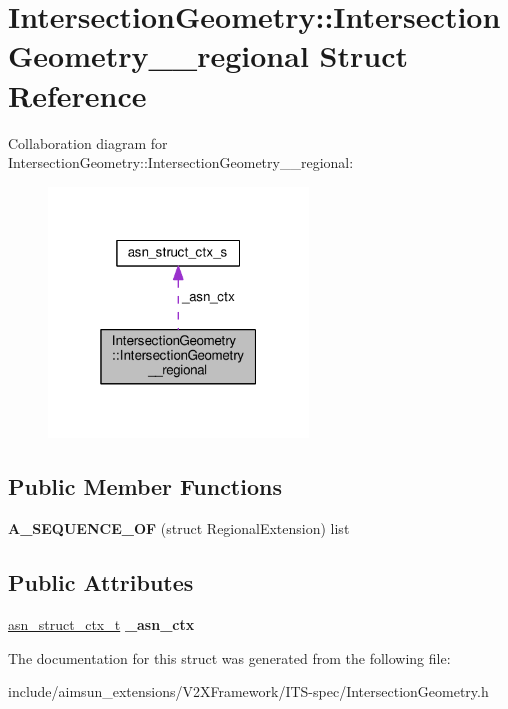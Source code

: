 \hypertarget{structIntersectionGeometry_1_1IntersectionGeometry____regional}{}\section{Intersection\+Geometry\+:\+:Intersection\+Geometry\+\_\+\+\_\+regional Struct Reference}
\label{structIntersectionGeometry_1_1IntersectionGeometry____regional}


Collaboration diagram for Intersection\+Geometry\+:\+:Intersection\+Geometry\+\_\+\+\_\+regional\+:\nopagebreak
\begin{figure}[H]
\begin{center}
\leavevmode
\includegraphics[width=196pt]{structIntersectionGeometry_1_1IntersectionGeometry____regional__coll__graph}
\end{center}
\end{figure}
\subsection*{Public Member Functions}
\begin{DoxyCompactItemize}
\item 
{\bfseries A\+\_\+\+S\+E\+Q\+U\+E\+N\+C\+E\+\_\+\+OF} (struct Regional\+Extension) list\hypertarget{structIntersectionGeometry_1_1IntersectionGeometry____regional_a5481f764757214bc303054ea8bcf8756}{}\label{structIntersectionGeometry_1_1IntersectionGeometry____regional_a5481f764757214bc303054ea8bcf8756}

\end{DoxyCompactItemize}
\subsection*{Public Attributes}
\begin{DoxyCompactItemize}
\item 
\hyperlink{structasn__struct__ctx__s}{asn\+\_\+struct\+\_\+ctx\+\_\+t} {\bfseries \+\_\+asn\+\_\+ctx}\hypertarget{structIntersectionGeometry_1_1IntersectionGeometry____regional_a39e9f8586830cfad128a46c810c18195}{}\label{structIntersectionGeometry_1_1IntersectionGeometry____regional_a39e9f8586830cfad128a46c810c18195}

\end{DoxyCompactItemize}


The documentation for this struct was generated from the following file\+:\begin{DoxyCompactItemize}
\item 
include/aimsun\+\_\+extensions/\+V2\+X\+Framework/\+I\+T\+S-\/spec/Intersection\+Geometry.\+h\end{DoxyCompactItemize}
